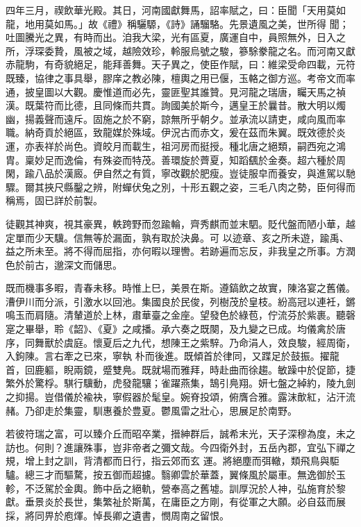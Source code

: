 \begin{pinyinscope}
 四年三月，禊飲華光殿。其日，河南國獻舞馬，詔率賦之，曰：臣聞「天用莫如龍，地用莫如馬。」故《禮》稱驪騵，《詩》誦騮駱。先景遺風之美，世所得
 聞；吐圖騰光之異，有時而出。洎我大梁，光有區夏，廣運自中，員照無外，日入之所，浮琛委贄，風被之域，越險效珍，軨服烏號之駿，篸駼豢龍之名。而河南又獻赤龍駒，有奇貌絕足，能拜善舞。天子異之，使臣作賦，曰：維梁受命四載，元符既臻，協律之事具舉，膠庠之教必陳，檀輿之用已偃，玉輅之御方巡。考帝文而率通，披皇圖以大觀。慶惟道而必先，靈匪聖其誰贊。見河龍之瑞唐，矚天馬之禎漢。既葉符而比德，且同條而共貫。詢國美於斯今，邁皇王於曩昔。散大明以燭幽，揚義聲而遠斥。固施之於不窮，諒無所乎朝夕。並承流以請吏，咸向風而率
 職。納奇貢於絕區，致龍媒於殊域。伊況古而赤文，爰在茲而朱翼。既效德於炎運，亦表祥於尚色。資皎月而載生，祖河房而挺授。種北唐之絕類，嗣西宛之鴻胄。稟妙足而逸倫，有殊姿而特茂。善環旋於薺夏，知蹈颻於金奏。超六種於周閑，踰八品於漢廄。伊自然之有質，寧改觀於肥瘦。豈徒服皁而養安，與進駕以馳驟。爾其挾尺縣鑿之辨，附蟬伏兔之別，十形五觀之姿，三毛八肉之勢，臣何得而稱焉，固已詳於前製。



 徒觀其神爽，視其豪異，軼跨野而忽踰輪，齊秀麒而並末駟。貶代盤而陋小華，越定單而少天驥。信無等於漏面，孰有取於決鼻。可
 以迹章、亥之所未遊，踰禹、益之所未至。將不得而屈指，亦何暇以理轡。若跡遍而忘反，非我皇之所事。方潤色於前古，邈深文而儲思。



 既而機事多暇，青春未移。時惟上巳，美景在斯。遵鎬飲之故實，陳洛宴之舊儀。漕伊川而分派，引激水以回池。集國良於民俊，列樹茂於皇枝。紛高冠以連衽，鏘鳴玉而肩隨。清輦道於上林，肅華臺之金座。望發色於綠苞，佇流芬於紫裹。聽磬寔之畢舉，聆《韶》、《夏》之咸播。承六奏之既闋，及九變之已成。均儀禽於唐序，同舞獸於虞庭。懷夏后之九代，想陳王之紫騂。乃命涓人，效良駿，經周衛，入鉤陳。言右牽之已來，寧執
 朴而後進。既傾首於律同，又蹀足於鼓振。擢龍首，回鹿軀，睨兩鏡，蹙雙鳧。既就場而雅拜，時赴曲而徐趨。敏躁中於促節，捷繁外於驚桴。騏行驥動，虎發龍驤；雀躍燕集，鵠引鳧翔。妍七盤之綽約，陵九劍之抑揚。豈借儀於褕袂，寧假器於髦皇。婉脊投頌，俯膺合雅。露沫歕紅，沾汗流赭。乃卻走於集靈，馴惠養於豊夏。鬱風雷之壯心，思展足於南野。



 若彼符瑞之富，可以臻介丘而昭卒業，搢紳群后，誠希末光，天子深穆為度，未之訪也。何則？進讓殊事，豈非帝者之彌文哉。今四衛外封，五岳內郡，宜弘下禪之規，增上封之訓，背清都而日行，指云郊而玄
 運。將絕塵而弭轍，類飛鳥與駏驢。總三才而驅騖，按五御而超攄。翳卿雲於華蓋，翼條風於屬車。無逸御於玉軫，不泛駕於金輿。飾中岳之絕軌，營奉高之舊墟。訓厚況於人神，弘施育於黎獻。垂景炎於長世，集繁祉於斯萬，在庸臣之方剛，有從軍之大願。必自茲而展採，將同畀於庖煇。悼長卿之遺書，憫周南之留恨。




\end{pinyinscope}
